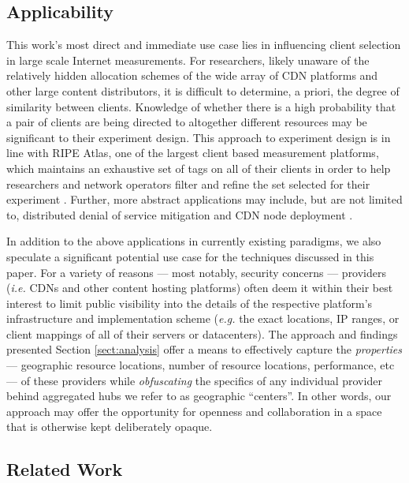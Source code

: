\subsection{Applicability} \label{applicability}

This work's most direct and immediate use case lies in influencing client
selection in large scale Internet measurements. For researchers, likely unaware of the relatively
hidden allocation schemes of the wide array of CDN platforms and other large content distributors,
it is difficult to determine, a priori, the degree of similarity between clients. Knowledge of
whether there is a high probability that a pair of clients are being directed to altogether
different resources may be significant to their experiment design. This approach to experiment
design is in line with RIPE Atlas, one of the largest client based measurement platforms,
which maintains
an exhaustive set of tags on all of their clients in order to help researchers and network operators
filter and refine the set selected for their experiment \cite{ripe-atlas}. Further, more abstract
applications may include, but are not limited to, distributed denial of service mitigation
\cite{anycastvsddos} and CDN node deployment \cite{35590, Tariq}.

In addition to the above applications in currently existing paradigms, we also
speculate a significant potential use case for the techniques discussed in this
paper. For a variety of reasons --- most notably, security concerns ---
providers (\emph{i.e.} CDNs and other content hosting platforms) often deem it
within their best interest to limit public visibility into the details of the
respective platform's infrastructure and implementation scheme (\emph{e.g.} the
exact locations, IP ranges, or client mappings of all of their servers or
datacenters). The approach and findings presented Section \ref{sect:analysis}
offer a means to effectively capture the \emph{properties} --- geographic
resource locations, number of resource locations, performance, etc --- of these
providers while \emph{obfuscating} the specifics of any individual provider
behind aggregated hubs we refer to as geographic ``centers''. In other
words, our approach may offer the opportunity for openness and collaboration in a
space that is otherwise kept deliberately opaque.

\subsection{Related Work} \label{related}

